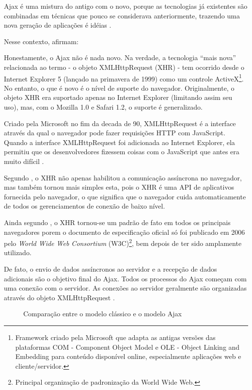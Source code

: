 Ajax é uma mistura do antigo com o novo, porque as tecnologias já existentes são combinadas em técnicas que pouco se considerava anteriormente, trazendo uma nova geração de aplicações é idéias \cite{gross2006introduction}.

Nesse contexto,  afirmam:
\begin{citacao}
	Honestamente, o Ajax não é nada novo. Na verdade, a tecnologia “mais nova” relacionada ao termo - o objeto XMLHttpRequest (XHR) - tem ocorrido desde o Internet Explorer 5 (lançado na primavera de 1999) como um controle ActiveX\footnote{Framework criado pela Microsoft que adapta as antigas versões das plataformas COM - Component Object Model e OLE - Object Linking and Embedding para conteúdo disponível online, especialmente aplicações web e cliente/servidor.}. No entanto, o que é novo é o nível de suporte do navegador. Originalmente, o objeto XHR era suportado apenas no Internet Explorer (limitando assim seu uso), mas, com o Mozilla 1.0 e Safari 1.2, o suporte é generalizado.
\end{citacao}

Criado pela Microsoft no fim da decada de 90, XMLHttpRequest é a interface através da qual o navegador pode fazer requisições HTTP com JavaScript. Quando a interface XMLHttpRequest foi adicionada ao Internet Explorer, ela permitiu que os desenvolvedores fizessem coisas com o JavaScript que antes era muito difícil \cite{haverbeke2014eloquent}.

Segundo , o XHR não apenas habilitou a comunicação assíncrona no navegador, mas também tornou mais simples esta, pois o XHR é uma API de aplicativos fornecida pelo navegador, o que significa que o navegador cuida automaticamente de todos os gerenciamentos de conexão de baixo nível.

Ainda segundo , o XHR tornou-se um padrão de fato em todos os principais navegadores porem o documento de especificação oficial só foi publicado em 2006 pelo \emph{World Wide Web Consortium} (W3C)\footnote{Principal organização de padronização da World Wide Web.}, bem depois de ter sido amplamente utilizado.

De fato, o envio de dados assíncronos ao servidor e a recepção de dados adicionais são o objetivo final do Ajax. Todos os processos do Ajax começam com uma conexão com o servidor. As conexões ao servidor geralmente são organizadas através do objeto XMLHttpRequest \cite{resig2007pro}.

\begin{figure}[!htb]
	\centering
	\hfill
	\caption{Comparação entre o modelo clássico e o modelo Ajax}
	\label{defaultVsAjax}
\end{figure}

